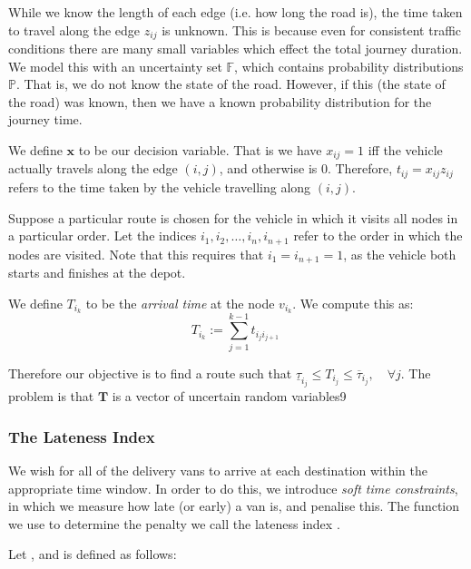 While we know the length of each edge (i.e. how long the road is), the time taken to travel along the edge $z_{ij}$ is unknown. This is because even for consistent traffic conditions there are many small variables which effect the total journey duration. We model this with an uncertainty set $\mathbb{F}$, which contains probability distributions $\mathbb{P}$. That is, we do not know the state of the road. However, if this (the state of the road) was known, then we have a known probability distribution for the journey time.

We define $\mathbf{x}$ to be our decision variable. That is we have $x_{ij}=1$ iff the vehicle actually travels along the edge $(i,j)$, and otherwise is $0$. Therefore, $t_{ij} = x_{ij}z_{ij}$ refers to the time taken by the vehicle travelling along $(i,j)$.

Suppose a particular route is chosen for the vehicle in which it visits all nodes in a particular order. Let the indices $i_1, i_2, \ldots, i_n, i_{n+1}$ refer to the order in which the nodes are visited. Note that this requires that $i_1 = i_{n+1} = 1$, as the vehicle both starts and finishes at the depot. 

\begin{definition}
	We define $T_{i_k}$ to be the \textit{arrival time} at the node $v_{i_k}$. We compute this as:
	\begin{equation}
		\label{def:arrival_time1}
		T_{i_k} := \sum \limits_{j = 1}^{k-1} t_{i_j i_{j+1}}\
	\end{equation}
\end{definition} 

Therefore our objective is to find a route such that $\underline{\tau}_{i_j}\leq T_{i_j} \leq \overline{\tau}_{i_j}, \quad \forall j$. The problem is that $\mathbf{T}$ is a vector of uncertain random variables9

\subsubsection{The Lateness Index}

We wish for all of the delivery vans to arrive at each destination within the appropriate time window. In order to do this, we introduce \textit{soft time constraints}, in which we measure how late (or early) a van is, and penalise this. The function we use to determine the penalty we call the lateness index \cite{jaillet2013routing,jaillet2016routing}. 

Let ,  and is defined as follows:

